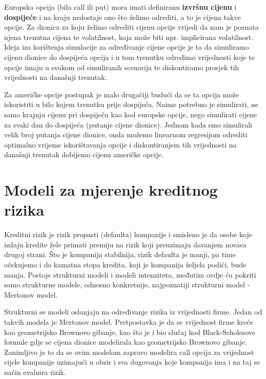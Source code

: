 \documentclass[times, utf8, seminar]{fer}
\begin{document}
Europska opcija (bila call ili put) mora imati definiranu \textbf{izvršnu cijenu} i \textbf{dospijeće} i na kraju nedostaje ono što želimo odrediti, a to je cijena takve opcije. Za dionica za koju želimo odrediti cijenu opcije vrijedi da nam je poznata njena trenutna cijena te volatilnost, koja može biti npr. implicirana volatilnost. Ideja iza korištenja simulacije za određivanje cijene opcije je ta da simuliramo cijenu dionice do dospijeća opcija i u tom trenutku odredimo vrijednosti koje te opcije imaju u svakom od simuliranih scenarija te diskontiramo prosjek tih vrijednosti na današnji trenutak.

Za američke opcije postupak je malo drugačiji budući da se ta opcija može iskoristiti u bilo kojem trenutku prije dospijeća. Naime potrebno je simulirati, ne samo krajnju cijenu pri dospijeću kao kod europske opcije, nego simulirati cijene za svaki dan do dospijeća (putanje cijene dionice). Jednom kada smo simulirali velik broj putanja cijene dionice, onda možemo linearnom regresijom odrediti optimalno vrijeme iskorištavanja opcije i diskontiranjem tih vrijednosti na današnji trenutak dobijemo cijenu američke opcije.

\chapter{Modeli za mjerenje kreditnog rizika}
Kreditni rizik je rizik propasti (defaulta) kompanije i smisleno je da osobe koje izdaju kredite žele primati premiju na rizik koji preuzimaju davanjem novaca drugoj strani. Što je kompanija stabilnija, rizik defaulta je manji, pa time očekujemo i da kamatna stopa kredita, koji je kompanija željela podići, bude manja. Postoje strukturni modeli i modeli intenziteta, međutim ovdje ću pokriti samo strukturne modele, odnosno konkretnije, najpoznatiji strukturni model - Mertonov model.

Strukturni se modeli oslanjaju na određivanje rizika iz vrijednosti firme. Jedan od takvih modela je Mertonov model. Pretpostavka je da se vrijednost firme kreće kao geometrijsko Brownovo gibanje, kao što je i bio slučaj kod Black-Scholesove formule gdje se cijena dionice modelirala kao geometrijsko Brownovo gibanje.
Zanimljivo je to da se ovim modelom zapravo modelira call opcija za vrijednost cijele kompanije uzimajući u obzir i sva dugovanja koje kompanija ima i na taj se način evaluira rizik.
\end{document}
